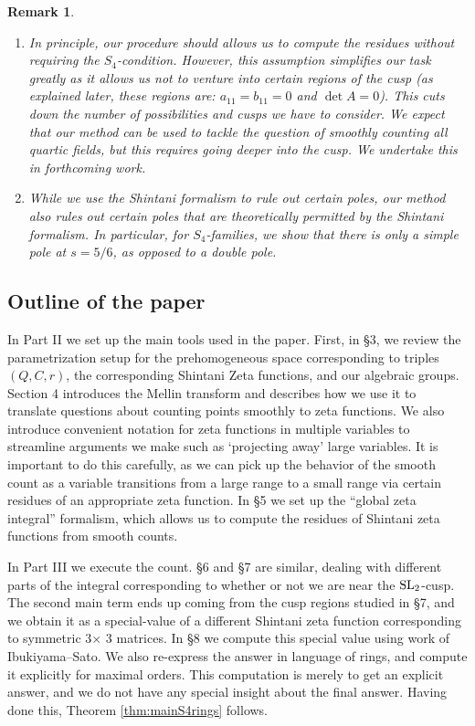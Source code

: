 \documentclass{article}
\def\SL{{\rm SL}}
\newtheorem{Remark}[Theorem]{Remark}
\begin{document}
\begin{Remark}{\rm 
\begin{enumerate}
\item In principle, our procedure should allows us to compute the residues without requiring the $S_4$-condition. However, this assumption simplifies our task greatly as it allows us not to venture into certain regions of the cusp (as explained later, these regions are: $a_{11}=b_{11}=0$ and $\det A=0$). This cuts down the number of possibilities and cusps we have to consider. We expect that our method can be used to tackle the question of smoothly counting all quartic fields, but this requires going deeper into the cusp. We undertake this in forthcoming work.
\item While we use the Shintani formalism to rule out certain poles, our method also rules out certain poles that are theoretically permitted by the Shintani formalism. In particular, for $S_4$-families, we show that there is only a simple pole at $s=5/6$, as opposed to a double pole.
\end{enumerate}
}\end{Remark}



\subsection*{Outline of the paper}

In Part II we set up the main tools used in the paper. First, in \S3, we review the parametrization setup for the prehomogeneous space corresponding to triples $(Q,C,r)$, the corresponding Shintani Zeta functions, and our algebraic groups. Section 4 introduces the Mellin transform and describes how we use it to translate questions about counting points smoothly to zeta functions. We also introduce convenient notation for zeta functions in multiple variables to streamline arguments we make such as `projecting away' large variables. It is important to do this carefully, as we can pick up the behavior of the smooth count as a variable transitions from a large range to a small range via certain residues of an appropriate zeta function. In \S5 we set up the ``global zeta integral'' formalism, which allows us to compute the residues of Shintani zeta functions from smooth counts.

In Part III we execute the count. \S6 and \S7 are similar, dealing with different parts of the integral corresponding to whether or not we are near the $\SL_2$-cusp. The second main term ends up coming from the cusp regions studied in \S7, and we obtain it as a special-value of a different Shintani zeta function corresponding to symmetric 3$\times$ 3 matrices. In \S8 we compute this special value using work of Ibukiyama--Sato. We also re-express the answer in language of rings, and compute it explicitly for maximal orders. This computation is merely to get an explicit answer, and we do not have any special insight about the final answer. Having done this, Theorem \ref{thm:mainS4rings} follows.
\end{document}
